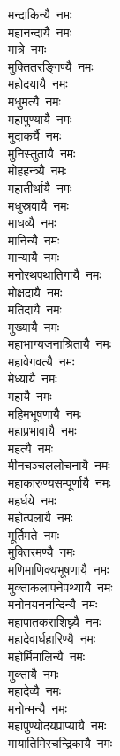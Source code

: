 \begin{multicols}{\maxColumns}
\begin{flushleft}
मन्दाकिन्यै~नमः\\
महानन्दायै~नमः\\
मात्रे~नमः\\
मुक्तितरङ्गिण्यै~नमः\\
महोदयायै~नमः\\
मधुमत्यै~नमः\\
महापुण्यायै~नमः\\
मुदाकर्यै~नमः\hfill{}\\
मुनिस्तुतायै~नमः\\
मोहहन्त्र्यै~नमः\\
महातीर्थायै~नमः\\
मधुस्रवायै~नमः\\
माधव्यै~नमः\\
मानिन्यै~नमः\\
मान्यायै~नमः\\
मनोरथपथातिगायै~नमः\\
मोक्षदायै~नमः\\
मतिदायै~नमः\hfill{}\\
मुख्यायै~नमः\\
महाभाग्यजनाश्रितायै~नमः\\
महावेगवत्यै~नमः\\
मेध्यायै~नमः\\
महायै~नमः\\
महिमभूषणायै~नमः\\
महाप्रभावायै~नमः\\
महत्यै~नमः\\
मीनचञ्चललोचनायै~नमः\\
महाकारुण्यसम्पूर्णायै~नमः\hfill{}\\
महर्धये~नमः\\
महोत्पलायै~नमः\\
मूर्तिमते~नमः\\
मुक्तिरमण्यै~नमः\\
मणिमाणिक्यभूषणायै~नमः\\
मुक्ताकलापनेपथ्यायै~नमः\\
मनोनयननन्दिन्यै~नमः\\
महापातकराशिघ्न्यै~नमः\\
महादेवार्धहारिण्यै~नमः\\
महोर्मिमालिन्यै~नमः\hfill{}\\
मुक्तायै~नमः\\
महादेव्यै~नमः\\
मनोन्मन्यै~नमः\\
महापुण्योदयप्राप्यायै~नमः\\
मायातिमिरचन्द्रिकायै~नमः\\

\end{flushleft}
\end{multicols}
